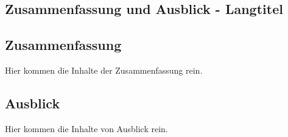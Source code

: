 \begin{showConclusion}%
%
\chapter[Zusammenfassung und Ausblick - Kurztitel für Inhaltsverzeichnis und Kolumnentitel]{Zusammenfassung und Ausblick - Langtitel}%
\label{chap:Zusammenfassung}
%
%
\section[Zusammenfassung - Kurztitel für Inhaltsverzeichnis und Kolumnentitel]{Zusammenfassung}%
\label{sec:Conclusion}
%
Hier kommen die Inhalte der Zusammenfassung rein.
%
%

\begin{showOutlook}%
%
\section[Ausblick - Kurztitel für Inhaltsverzeichnis und Kolumnentitel]{Ausblick}%
\label{sec:Outlook}
%
Hier kommen die Inhalte von Ausblick rein.
%
%
\end{showOutlook}%
%
\end{showConclusion}%
